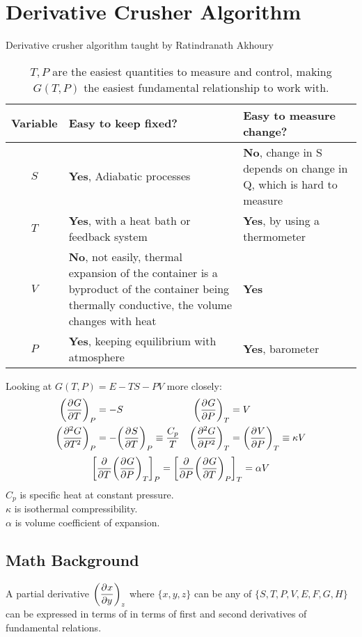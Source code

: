 \documentclass{article}
\date{Winter 2022}
\author{\EC}
\begin{document}
\section{Derivative Crusher Algorithm}
    Derivative crusher algorithm taught by Ratindranath Akhoury
    \begin{table}[H]
        \renewcommand{\arraystretch}{1.5}
        \centering
        \begin{tabular}{|c|m{5.5cm}|m{5cm}|}
            \hline
            Variable & Easy to keep fixed? & Easy to measure change? 
            \\\hline
            $S$ & \textcolor{SpringGreen3}{\textbf{Yes}}, Adiabatic processes & \textcolor{OrangeRed3}{\textbf{No}}, change in S depends on change in Q, which is hard to measure
            \\\hline
            $T$ & \textcolor{SpringGreen3}{\textbf{Yes}}, with a heat bath or feedback system& \textcolor{SpringGreen3}{\textbf{Yes}}, by using a thermometer
            \\\hline
            $V$ & \textcolor{OrangeRed3}{\textbf{No}}, not easily, thermal expansion of the container is a byproduct of the container being thermally conductive, the volume changes with heat & \textcolor{SpringGreen3}{\textbf{Yes}}
            \\\hline
            $P$ & \textcolor{SpringGreen3}{\textbf{Yes}}, keeping equilibrium with atmosphere & \textcolor{SpringGreen3}{\textbf{Yes}}, barometer
            \\\hline
        \end{tabular}
        \caption{$T,P$ are the easiest quantities to measure and control, making $G(T,P)$ the easiest fundamental relationship to work with.}
    \end{table}
    Looking at $G(T,P)=E-TS-PV$ more closely: 
    \begin{align*}
        \qty(\pder{G}{T})_{P}&=-S & \qty(\pder{G}{P})_{T}&=V
        \\
        \qty(\pder[2]{G}{T})_{P}&=-\qty(\pder{S}{T})_{P}\equiv\frac{C_p}{T} & \qty(\pder[2]{G}{P})_T&=\qty(\pder{V}{P})_T\equiv\kappa V
    \end{align*}
    \begin{equation*}
        \qty[\pder{T}\qty(\pder{G}{P})_{T}]_{P}=\qty[\pder{P}\qty(\pder{G}{T})_{P}]_{T}=\alpha V
    \end{equation*}
    $C_p$ is specific heat at constant pressure. 
    \\
    $\kappa$ is isothermal compressibility.
    \\
    $\alpha$ is volume coefficient of expansion.
    \subsection{Math Background}
    A partial derivative $\displaystyle \qty(\pder{x}{y})_z$ where $\{x,y,z\}$ can be any of $\{S,T,P,V,E,F,G,H\}$ can be expressed in terms of in terms of first and second derivatives of fundamental relations. 
\end{document}
